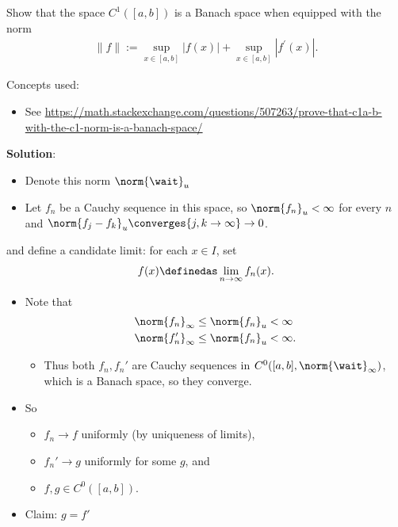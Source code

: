 Show that the space \(C^1([a, b])\) is a Banach space when equipped with
the norm
\begin{align*}
\|f\|:=\sup _{x \in[a, b]}|f(x)|+\sup _{x \in[a, b]}\left|f^{\prime}(x)\right|.
\end{align*}

\begin{solution}

Concepts used:

\begin{itemize}
\tightlist
\item
  See
  \url{https://math.stackexchange.com/questions/507263/prove-that-c1a-b-with-the-c1-norm-is-a-banach-space/}
\end{itemize}

\textbf{Solution}:

\begin{itemize}
\item
  Denote this norm \(\norm{\wait}_u\)
\item
  Let \(f_n\) be a Cauchy sequence in this space, so
  \(\norm{f_n}_u < \infty\) for every \(n\) and
  \(\norm{f_j - f_k}_u \converges{j, k\to\infty}\to 0\).
\end{itemize}

and define a candidate limit: for each \(x\in I\), set
\begin{align*}f(x) \definedas \lim_{n\to\infty} f_n(x).\end{align*}

\begin{itemize}
\item
  Note that
  \begin{align*} 
  \norm{f_n}_\infty &\leq \norm{f_n}_u < \infty \\
  \norm{f_n'}_\infty &\leq \norm{f_n}_u < \infty
  .\end{align*}

  \begin{itemize}
  \tightlist
  \item
    Thus both \(f_n, f_n'\) are Cauchy sequences in
    \(C^0([a, b], \norm{\wait}_\infty)\), which is a Banach space, so
    they converge.
  \end{itemize}
\item
  So

  \begin{itemize}
  \tightlist
  \item
    \(f_n \to f\) uniformly (by uniqueness of limits),
  \item
    \(f_n' \to g\) uniformly for some \(g\), and
  \item
    \(f, g\in C^0([a, b])\).
  \end{itemize}
\item
  Claim: \(g = f'\)


\end{itemize}
\end{solution}
